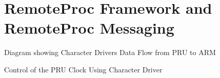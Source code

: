 \chapter{RemoteProc Framework and RemoteProc Messaging}


Diagram showing Character Drivers
Data Flow from PRU to ARM

Control of the PRU Clock Using Character Driver

